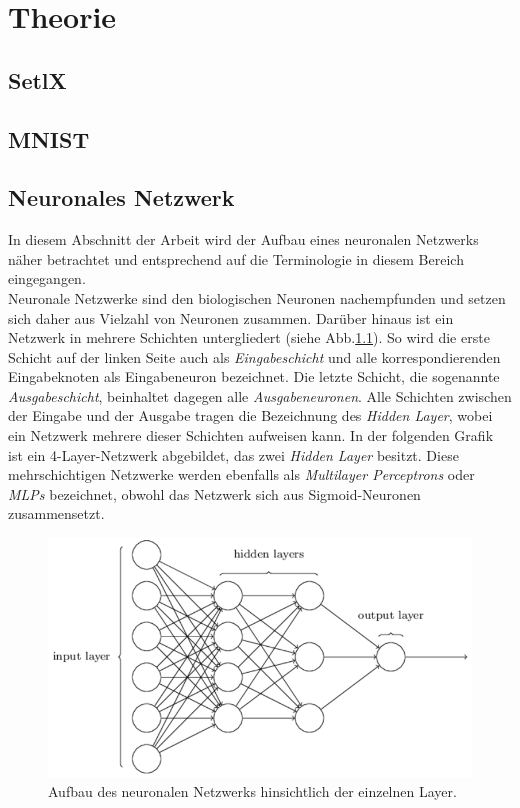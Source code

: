 \chapter{Theorie}

\section{SetlX}

\section{MNIST}

\section{Neuronales Netzwerk}
In diesem Abschnitt der Arbeit wird der Aufbau eines neuronalen Netzwerks näher betrachtet und entsprechend auf die Terminologie in diesem Bereich eingegangen. \\
Neuronale Netzwerke sind den biologischen Neuronen nachempfunden und setzen sich daher aus Vielzahl von Neuronen zusammen. Darüber hinaus ist ein Netzwerk in mehrere Schichten untergliedert (siehe Abb.\ref{fig:neural_network_extended}). So wird die erste Schicht auf der linken Seite auch als \textit{Eingabeschicht} und alle korrespondierenden Eingabeknoten als Eingabeneuron bezeichnet. Die letzte Schicht, die sogenannte \textit{Ausgabeschicht}, beinhaltet dagegen alle \textit{Ausgabeneuronen}. Alle Schichten zwischen der Eingabe und der Ausgabe tragen die Bezeichnung des \textit{Hidden Layer}, wobei ein Netzwerk mehrere dieser Schichten aufweisen kann. In der folgenden Grafik ist ein 4-Layer-Netzwerk abgebildet, das zwei \textit{Hidden Layer} besitzt. Diese mehrschichtigen Netzwerke werden ebenfalls als \textit{Multilayer Perceptrons} oder \textit{MLPs} bezeichnet, obwohl das Netzwerk sich aus Sigmoid-Neuronen zusammensetzt.
\begin{figure}[hbt]
	\centering
	\includegraphics[scale=0.6]{Bilder/neural_network_extended}
	\caption{Aufbau des neuronalen Netzwerks hinsichtlich der einzelnen Layer.} 
	\label{fig:neural_network_extended} 
\end{figure}

